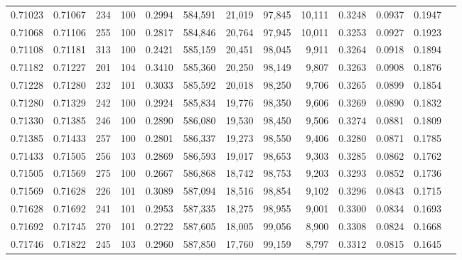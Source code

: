 \begin{tabular}{rrrrrrrrrrrrr}
0.71023 & 0.71067 &   234 & 100 &                                     0.2994 & 584,591 &  21,019 &  97,845 &  10,111 & 0.3248 & 0.0937 & 0.1947 \\
0.71068 & 0.71106 &   255 & 100 &                                     0.2817 & 584,846 &  20,764 &  97,945 &  10,011 & 0.3253 & 0.0927 & 0.1923 \\
0.71108 & 0.71181 &   313 & 100 &                                     0.2421 & 585,159 &  20,451 &  98,045 &   9,911 & 0.3264 & 0.0918 & 0.1894 \\
0.71182 & 0.71227 &   201 & 104 &                                     0.3410 & 585,360 &  20,250 &  98,149 &   9,807 & 0.3263 & 0.0908 & 0.1876 \\
0.71228 & 0.71280 &   232 & 101 &                                     0.3033 & 585,592 &  20,018 &  98,250 &   9,706 & 0.3265 & 0.0899 & 0.1854 \\
0.71280 & 0.71329 &   242 & 100 &                                     0.2924 & 585,834 &  19,776 &  98,350 &   9,606 & 0.3269 & 0.0890 & 0.1832 \\
0.71330 & 0.71385 &   246 & 100 &                                     0.2890 & 586,080 &  19,530 &  98,450 &   9,506 & 0.3274 & 0.0881 & 0.1809 \\
0.71385 & 0.71433 &   257 & 100 &                                     0.2801 & 586,337 &  19,273 &  98,550 &   9,406 & 0.3280 & 0.0871 & 0.1785 \\
0.71433 & 0.71505 &   256 & 103 &                                     0.2869 & 586,593 &  19,017 &  98,653 &   9,303 & 0.3285 & 0.0862 & 0.1762 \\
0.71505 & 0.71569 &   275 & 100 &                                     0.2667 & 586,868 &  18,742 &  98,753 &   9,203 & 0.3293 & 0.0852 & 0.1736 \\
0.71569 & 0.71628 &   226 & 101 &                                     0.3089 & 587,094 &  18,516 &  98,854 &   9,102 & 0.3296 & 0.0843 & 0.1715 \\
0.71628 & 0.71692 &   241 & 101 &                                     0.2953 & 587,335 &  18,275 &  98,955 &   9,001 & 0.3300 & 0.0834 & 0.1693 \\
0.71692 & 0.71745 &   270 & 101 &                                     0.2722 & 587,605 &  18,005 &  99,056 &   8,900 & 0.3308 & 0.0824 & 0.1668 \\
0.71746 & 0.71822 &   245 & 103 &                                     0.2960 & 587,850 &  17,760 &  99,159 &   8,797 & 0.3312 & 0.0815 & 0.1645 \\

\end{tabular}

